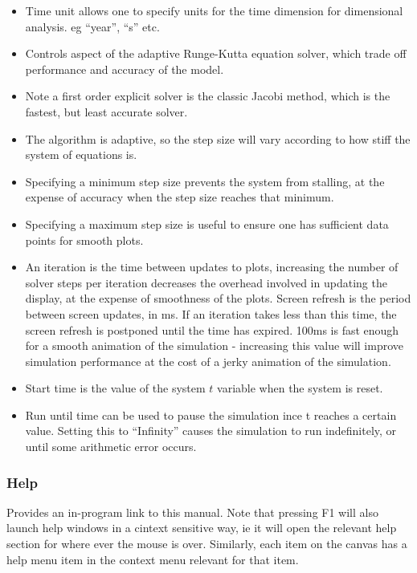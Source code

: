 \label{RungeKutta}
\begin{itemize}
\item Time unit allows one to specify units for the time dimension for dimensional
analysis. eg ``year'', ``s'' etc. 
\item Controls aspect of the adaptive Runge-Kutta equation solver, which
trade off performance and accuracy of the model. 
\item Note a first order explicit solver is the classic Jacobi method, which
is the fastest, but least accurate solver. 
\item The algorithm is adaptive, so the step size will vary according to
how stiff the system of equations is. 
\item Specifying a minimum step size prevents the system from stalling,
at the expense of accuracy when the step size reaches that minimum. 
\item Specifying a maximum step size is useful to ensure one has sufficient
data points for smooth plots. 
\item An iteration is the time between updates to plots, increasing the
number of solver steps per iteration decreases the overhead involved
in updating the display, at the expense of smoothness of the plots.
Screen refresh is the period between screen updates, in ms. If an
iteration takes less than this time, the screen refresh is postponed
until the time has expired. 100ms is fast enough for a smooth animation
of the simulation - increasing this value will improve simulation
performance at the cost of a jerky animation of the simulation. 
\item Start time is the value of the system $t$ variable when the system
is reset. 
\item Run until time can be used to pause the simulation ince t reaches
a certain value. Setting this to ``Infinity'' causes the simulation
to run indefinitely, or until some arithmetic error occurs. 
\end{itemize}

\subsubsection{Help}

\label{Help}

Provides an in-program link to this manual. Note that pressing F1
will also launch help windows in a cintext sensitive way, ie it will
open the relevant help section for where ever the mouse is over. Similarly,
each item on the canvas has a help menu item in the context menu relevant
for that item.

